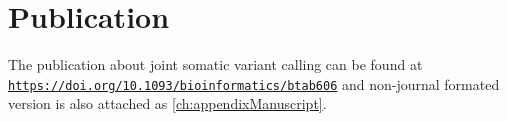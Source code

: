 \section{Publication}
The publication about joint somatic variant calling can be found at \href{https://doi.org/10.1093/bioinformatics/btab606}{\nolinkurl{https://doi.org/10.1093/bioinformatics/btab606}} and non-journal formated version is also attached as \autoref{ch:appendixManuscript}.

